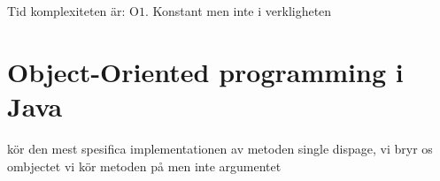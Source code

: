 Tid komplexiteten är: O\(1\). Konstant men inte i verkligheten



\section{Object-Oriented programming i Java}




kör den mest spesifica implementationen av metoden
single dispage, vi bryr os ombjectet vi kör metoden på men inte argumentet
